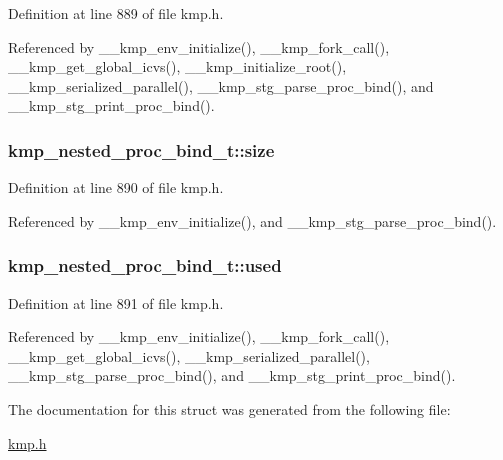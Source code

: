 Definition at line 889 of file kmp.\-h.



Referenced by \-\_\-\-\_\-kmp\-\_\-env\-\_\-initialize(), \-\_\-\-\_\-kmp\-\_\-fork\-\_\-call(), \-\_\-\-\_\-kmp\-\_\-get\-\_\-global\-\_\-icvs(), \-\_\-\-\_\-kmp\-\_\-initialize\-\_\-root(), \-\_\-\-\_\-kmp\-\_\-serialized\-\_\-parallel(), \-\_\-\-\_\-kmp\-\_\-stg\-\_\-parse\-\_\-proc\-\_\-bind(), and \-\_\-\-\_\-kmp\-\_\-stg\-\_\-print\-\_\-proc\-\_\-bind().

\hypertarget{structkmp__nested__proc__bind__t_a8d4665f73ce63116fafb7568c4b4c4b1}{
\subsubsection[{size}]{ kmp\-\_\-nested\-\_\-proc\-\_\-bind\-\_\-t\-::size}}\label{structkmp__nested__proc__bind__t_a8d4665f73ce63116fafb7568c4b4c4b1}


Definition at line 890 of file kmp.\-h.



Referenced by \-\_\-\-\_\-kmp\-\_\-env\-\_\-initialize(), and \-\_\-\-\_\-kmp\-\_\-stg\-\_\-parse\-\_\-proc\-\_\-bind().

\hypertarget{structkmp__nested__proc__bind__t_a4ab1e74b13e91c54a0ff105c9d7db9f6}{
\subsubsection[{used}]{ kmp\-\_\-nested\-\_\-proc\-\_\-bind\-\_\-t\-::used}}\label{structkmp__nested__proc__bind__t_a4ab1e74b13e91c54a0ff105c9d7db9f6}


Definition at line 891 of file kmp.\-h.



Referenced by \-\_\-\-\_\-kmp\-\_\-env\-\_\-initialize(), \-\_\-\-\_\-kmp\-\_\-fork\-\_\-call(), \-\_\-\-\_\-kmp\-\_\-get\-\_\-global\-\_\-icvs(), \-\_\-\-\_\-kmp\-\_\-serialized\-\_\-parallel(), \-\_\-\-\_\-kmp\-\_\-stg\-\_\-parse\-\_\-proc\-\_\-bind(), and \-\_\-\-\_\-kmp\-\_\-stg\-\_\-print\-\_\-proc\-\_\-bind().



The documentation for this struct was generated from the following file\-:\begin{DoxyCompactItemize}
\item 
\hyperlink{kmp_8h}{kmp.\-h}\end{DoxyCompactItemize}

